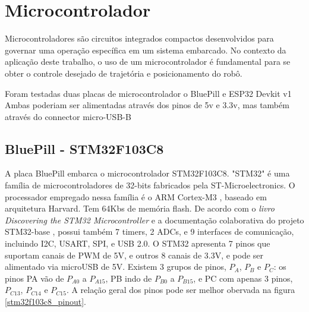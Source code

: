 
\section{Microcontrolador}

Microcontroladores são circuitos integrados compactos desenvolvidos para governar
uma operação específica em um sistema embarcado. No contexto da aplicação deste
trabalho, o uso de um microcontrolador é fundamental para se obter o controle
desejado de trajetória e posicionamento do robô.

Foram testadas duas placas de microcontrolador o BluePill e ESP32 Devkit v1
Ambas poderiam ser alimentadas através dos pinos de 5v e 3.3v, mas também através do connector micro-USB-B

\subsection{BluePill - STM32F103C8}

A placa BluePill embarca o microcontrolador STM32F103C8.
"STM32" é uma família de microcontroladores de 32-bits fabricados pela
ST-Microelectronics. O processador empregado nessa família é o ARM Cortex-M3 \cite{cortex_m3},
baseado em arquitetura Harvard. Tem 64Kbs de memória flash.  De acordo com o \textit{livro Discovering the STM32 Microcontroller} \cite{stm_doc} e 
a documentação colaborativa \cite{stm32_base_org} do projeto STM32-base \cite{stm32_base},
possui também 
7 timers, 2 ADCs, e 9 interfaces de comunicação, incluindo I2C,  USART, SPI, e USB 2.0. 
O STM32 apresenta 7 pinos que suportam canais de PWM de 5V, e outros 8 canais de 3.3V, e pode ser alimentado
via microUSB de 5V. Existem 3 grupos de pinos,  $P_{A}$,  $P_{B}$ e  $P_{C}$: os pinos PA vão de $P_{A0}$ 
a $P_{A15}$, PB indo de $P_{B0}$ a $P_{B15}$, e PC com apenas 3 pinos, $P_{C13}$, $P_{C14}$ e $P_{C15}$.
A relação geral dos pinos pode ser melhor obervada na figura \ref{stm32f103c8_pinout}.

